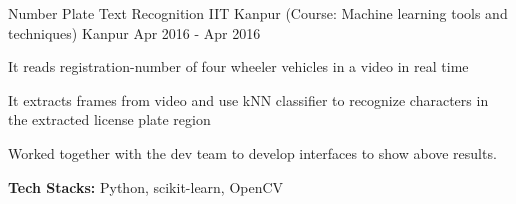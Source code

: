 \begin{cventries}
      \cventry
    {Number Plate Text Recognition} %
    {IIT Kanpur (Course: Machine learning tools and techniques)} %
    {Kanpur} %
    {Apr 2016 - Apr 2016} %
    {
      \begin{cvitems} %
        \item {It reads registration-number of four wheeler vehicles in a video in real time}
        \item {It extracts frames from video and use kNN classifier to recognize characters in the extracted license plate region}
        \item {Worked together with the dev team to develop interfaces to show above results.} 
        \item {\textbf{Tech Stacks:} Python, scikit-learn, OpenCV}
      \end{cvitems}
    }






\end{cventries}

